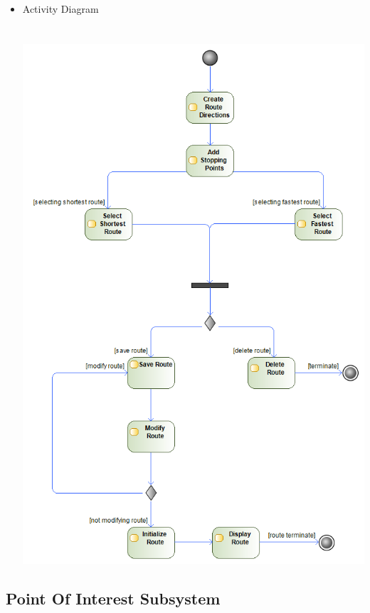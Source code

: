 \documentclass{article}
\begin{document}
\begin{itemize}
				\item Activity Diagram
 				\\
 				\\
 				\\ 			
				\includegraphics[scale=0.45]{navigationActivityDiagram.png}
				
				
			\end{itemize}
		\subsection{Point Of Interest Subsystem}
			
\end{document}

